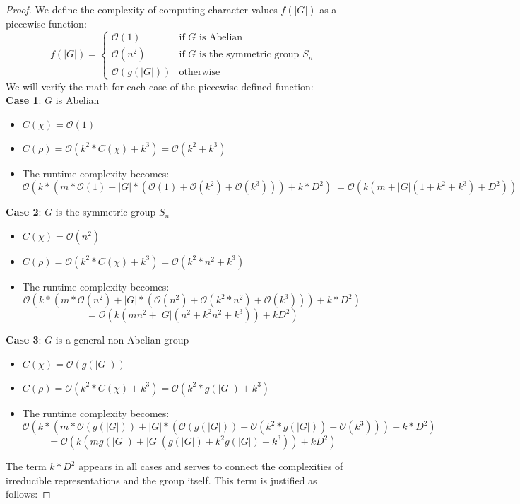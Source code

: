 \documentclass[11pt,a4paper]{article}
\begin{document}
\begin{proof}
We define the complexity of computing character values $f(|G|)$ as a piecewise function:
\[
f(|G|) =
\begin{cases}
\mathcal{O}(1) & \text{if } G \text{ is Abelian} \\
\mathcal{O}(n^2) & \text{if } G \text{ is the symmetric group } S_n \\
\mathcal{O}(g(|G|)) & \text{otherwise}
\end{cases}
\]
We will verify the math for each case of the piecewise defined function: \\
\textbf{Case 1}: $G$ is Abelian
\begin{itemize}
\item $C(\chi) = \mathcal{O}(1)$
\item $C(\rho) = \mathcal{O}(k^2 * C(\chi) + k^3) = \mathcal{O}(k^2 + k^3)$
\item The runtime complexity becomes:
\[
\mathcal{O}(k * (m * \mathcal{O}(1) + |G| * (\mathcal{O}(1) + \mathcal{O}(k^2) + \mathcal{O}(k^3))) + k * D^2) \
= \mathcal{O}(k (m + |G| (1 + k^2 + k^3) + D^2))
\]
\end{itemize}
\textbf{Case 2}: $G$ is the symmetric group $S_n$
\begin{itemize}
\item $C(\chi) = \mathcal{O}(n^2)$
\item $C(\rho) = \mathcal{O}(k^2 * C(\chi) + k^3) = \mathcal{O}(k^2 * n^2 + k^3)$
\item The runtime complexity becomes:
\[
\mathcal{O}(k * (m * \mathcal{O}(n^2) + |G| * (\mathcal{O}(n^2) + \mathcal{O}(k^2 * n^2) + \mathcal{O}(k^3))) + k * D^2)\]
\[
= \mathcal{O}(k (m n^2 + |G| (n^2 + k^2 n^2 + k^3)) + k D^2)
\]
\end{itemize}
\textbf{Case 3}: $G$ is a general non-Abelian group
\begin{itemize}
\item $C(\chi) = \mathcal{O}(g(|G|))$
\item $C(\rho) = \mathcal{O}(k^2 * C(\chi) + k^3) = \mathcal{O}(k^2 * g(|G|) + k^3)$
\item The runtime complexity becomes:
\[
\mathcal{O}(k * (m * \mathcal{O}(g(|G|)) + |G| * (\mathcal{O}(g(|G|)) + \mathcal{O}(k^2 * g(|G|)) + \mathcal{O}(k^3))) + k * D^2) \]\[
= \mathcal{O}(k (m g(|G|) + |G| (g(|G|) + k^2 g(|G|) + k^3)) + k D^2)
\]
\end{itemize}
The term $k * D^2$ appears in all cases and serves to connect the complexities of irreducible representations and the group itself. This term is justified as follows:

\end{proof}
\end{document}
